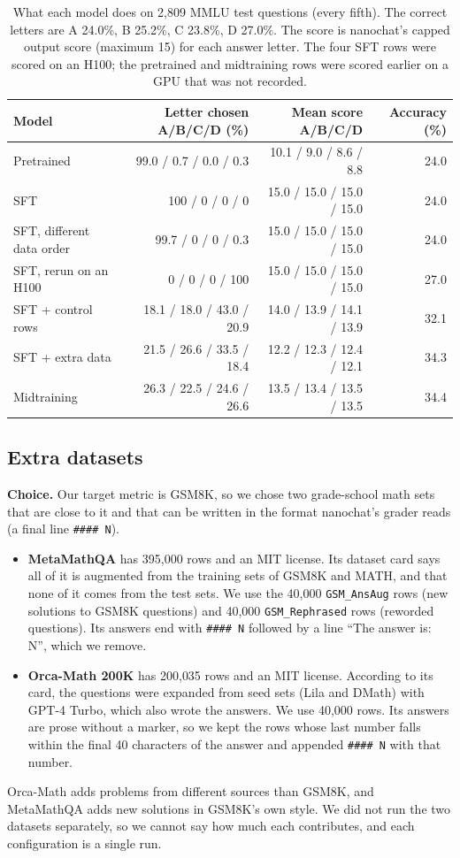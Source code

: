 \documentclass[10pt]{article}
\newcommand{\code}[1]{\texttt{#1}}
\begin{document}
\begin{table}[h]
\centering
\small
\begin{tabular}{lrrr}
\toprule
Model & Letter chosen A/B/C/D (\%) & Mean score A/B/C/D & Accuracy (\%) \\
\midrule
Pretrained & 99.0 / 0.7 / 0.0 / 0.3 & 10.1 / 9.0 / 8.6 / 8.8 & 24.0 \\
SFT & 100 / 0 / 0 / 0 & 15.0 / 15.0 / 15.0 / 15.0 & 24.0 \\
SFT, different data order & 99.7 / 0 / 0 / 0.3 & 15.0 / 15.0 / 15.0 / 15.0 & 24.0 \\
SFT, rerun on an H100 & 0 / 0 / 0 / 100 & 15.0 / 15.0 / 15.0 / 15.0 & 27.0 \\
SFT + control rows & 18.1 / 18.0 / 43.0 / 20.9 & 14.0 / 13.9 / 14.1 / 13.9 & 32.1 \\
SFT + extra data & 21.5 / 26.6 / 33.5 / 18.4 & 12.2 / 12.3 / 12.4 / 12.1 & 34.3 \\
Midtraining & 26.3 / 22.5 / 24.6 / 26.6 & 13.5 / 13.4 / 13.5 / 13.5 & 34.4 \\
\bottomrule
\end{tabular}
\caption{What each model does on 2{,}809 MMLU test questions (every fifth). The correct letters are A 24.0\%, B 25.2\%, C 23.8\%, D 27.0\%. The score is nanochat's capped output score (maximum 15) for each answer letter. The four SFT rows were scored on an H100; the pretrained and midtraining rows were scored earlier on a GPU that was not recorded.}
\label{tab:mc}
\end{table}

\subsection*{Extra datasets}
\textbf{Choice.} Our target metric is GSM8K, so we chose two grade-school math sets that are close to it and that can be written in the format nanochat's grader reads (a final line \code{\#\#\#\# N}).
\begin{itemize}
\item \textbf{MetaMathQA} \cite{metamath} has 395{,}000 rows and an MIT license. Its dataset card says all of it is augmented from the training sets of GSM8K and MATH, and that none of it comes from the test sets. We use the 40{,}000 \code{GSM\_AnsAug} rows (new solutions to GSM8K questions) and 40{,}000 \code{GSM\_Rephrased} rows (reworded questions). Its answers end with \code{\#\#\#\# N} followed by a line ``The answer is: N'', which we remove.
\item \textbf{Orca-Math 200K} \cite{orcamath} has 200{,}035 rows and an MIT license. According to its card, the questions were expanded from seed sets (Lila and DMath) with GPT-4 Turbo, which also wrote the answers. We use 40{,}000 rows. Its answers are prose without a marker, so we kept the rows whose last number falls within the final 40 characters of the answer and appended \code{\#\#\#\# N} with that number.
\end{itemize}
Orca-Math adds problems from different sources than GSM8K, and MetaMathQA adds new solutions in GSM8K's own style. We did not run the two datasets separately, so we cannot say how much each contributes, and each configuration is a single run.
\end{document}
